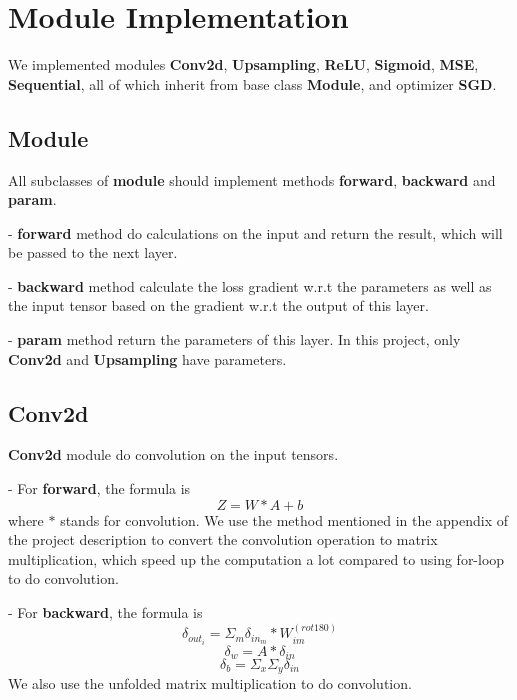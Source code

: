 \section{Module Implementation}

We implemented modules \textbf{Conv2d}, \textbf{Upsampling}, \textbf{ReLU}, \textbf{Sigmoid}, \textbf{MSE},  \textbf{Sequential}, all of which inherit from base class \textbf{Module}, and optimizer \textbf{SGD}.

\subsection{Module}

All subclasses of \textbf{module} should implement methods \textbf{forward}, \textbf{backward} and \textbf{param}. 

- \textbf{forward} method do calculations on the input and return the result, which will be passed to the next layer. 

- \textbf{backward} method calculate the loss gradient w.r.t the parameters as well as the input tensor based on the gradient w.r.t the output of this layer. 

- \textbf{param} method return the parameters of this layer. In this project, only \textbf{Conv2d} and \textbf{Upsampling} have parameters. 



\subsection{Conv2d}

\textbf{Conv2d} module do convolution on the input tensors. 

- For \textbf{forward}, the formula is 
\begin{equation}
    Z=W*A+b
\end{equation}
 where $*$ stands for convolution. We use the method mentioned in the appendix of the project description to convert the convolution operation to matrix multiplication, which speed up the computation a lot compared to using for-loop to do convolution. 

- For \textbf{backward}, the formula is 
\begin{equation}
    \delta_{out_{i}}=\Sigma_m\delta_{in_m}*W_{im}^{(rot180)}
\end{equation}
\begin{equation}
    \delta_w=A*\delta_{in} 
\end{equation}
\begin{equation}
    \delta_b=\Sigma_x\Sigma_y\delta_{in}
\end{equation}
We also use the unfolded matrix multiplication to do convolution.

